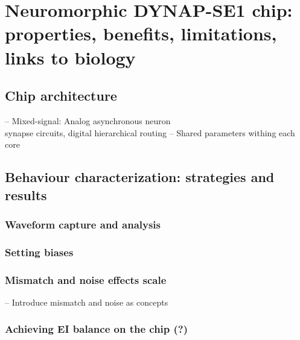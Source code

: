 \chapter{Neuromorphic DYNAP-SE1 chip: properties, benefits, limitations, links to biology}
\label{ch:neuromorphic_harware}


\section{Chip architecture}

-- Mixed-signal: Analog asynchronous neuron\\synapse circuits, digital hierarchical routing
-- Shared parameters withing each core

\section{Behaviour characterization: strategies and results}
\subsection{Waveform capture and analysis}
\subsection{Setting biases}
\subsection{Mismatch and noise effects scale}

-- Introduce mismatch and noise as concepts


\subsection{Achieving EI balance on the chip (?)}